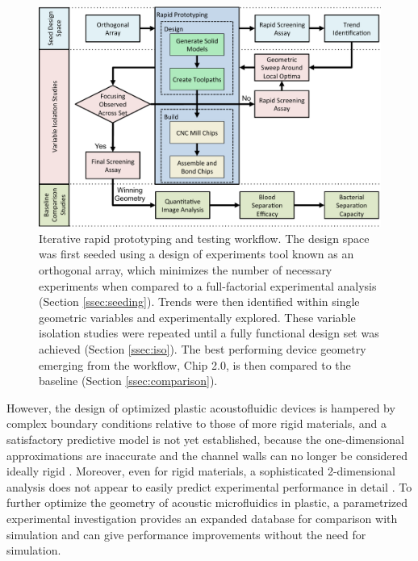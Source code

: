 \begin{figure}[htb]
  \begin{minipage}[t]{0.99\linewidth}\centering
    \includegraphics[width=14cm]{flow.pdf}
  \end{minipage}\hfill
  \caption[Rapid prototyping workflow]{Iterative rapid prototyping and testing workflow. The design space was first seeded using a design of experiments tool known as an orthogonal array, which minimizes the number of necessary experiments when compared to a full-factorial experimental analysis (Section \ref{ssec:seeding}). Trends were then identified within single geometric variables and experimentally explored. These variable isolation studies were repeated until a fully functional design set was achieved (Section \ref{ssec:iso}). The best performing device geometry emerging from the workflow, Chip 2.0, is then compared to the baseline (Section \ref{ssec:comparison}).}
\label{fig:flow}       %
\end{figure}

However, the design of optimized plastic acoustofluidic devices is hampered by complex boundary conditions relative to those of more rigid materials, and a satisfactory predictive model is not yet established, because the one-dimensional approximations are inaccurate and the channel walls can no longer be considered ideally rigid \cite{mueller2013continuous}.  Moreover, even for rigid materials, a sophisticated 2-dimensional analysis does not appear to easily predict experimental performance in detail \cite{garofalo2016performance}\cite{bora2015efficient}. To further optimize the geometry of acoustic microfluidics in plastic, a parametrized experimental investigation provides an expanded database for comparison with simulation and can give performance improvements without the need for simulation.  

